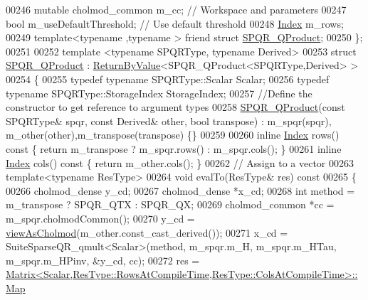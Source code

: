\begin{DoxyCode}
00246     \textcolor{keyword}{mutable} cholmod\_common m\_cc; \textcolor{comment}{// Workspace and parameters}
00247     \textcolor{keywordtype}{bool} m\_useDefaultThreshold;     \textcolor{comment}{// Use default threshold}
00248     \hyperlink{namespace_eigen_a62e77e0933482dafde8fe197d9a2cfde}{Index} m\_rows;
00249     \textcolor{keyword}{template}<\textcolor{keyword}{typename} ,\textcolor{keyword}{typename} > \textcolor{keyword}{friend} \textcolor{keyword}{struct }\hyperlink{struct_eigen_1_1_s_p_q_r___q_product}{SPQR\_QProduct};
00250 \};
00251 
00252 \textcolor{keyword}{template} <\textcolor{keyword}{typename} SPQRType, \textcolor{keyword}{typename} Derived>
00253 \textcolor{keyword}{struct }\hyperlink{struct_eigen_1_1_s_p_q_r___q_product}{SPQR\_QProduct} : \hyperlink{group___core___module_class_eigen_1_1_return_by_value}{ReturnByValue}<SPQR\_QProduct<SPQRType,Derived> >
00254 \{
00255   \textcolor{keyword}{typedef} \textcolor{keyword}{typename} SPQRType::Scalar Scalar;
00256   \textcolor{keyword}{typedef} \textcolor{keyword}{typename} SPQRType::StorageIndex StorageIndex;
00257   \textcolor{comment}{//Define the constructor to get reference to argument types}
00258   \hyperlink{struct_eigen_1_1_s_p_q_r___q_product}{SPQR\_QProduct}(\textcolor{keyword}{const} SPQRType& spqr, \textcolor{keyword}{const} Derived& other, \textcolor{keywordtype}{bool} transpose) : m\_spqr(spqr),
      m\_other(other),m\_transpose(transpose) \{\}
00259   
00260   \textcolor{keyword}{inline} \hyperlink{namespace_eigen_a62e77e0933482dafde8fe197d9a2cfde}{Index} rows()\textcolor{keyword}{ const }\{ \textcolor{keywordflow}{return} m\_transpose ? m\_spqr.rows() : m\_spqr.cols(); \}
00261   \textcolor{keyword}{inline} \hyperlink{namespace_eigen_a62e77e0933482dafde8fe197d9a2cfde}{Index} cols()\textcolor{keyword}{ const }\{ \textcolor{keywordflow}{return} m\_other.cols(); \}
00262   \textcolor{comment}{// Assign to a vector}
00263   \textcolor{keyword}{template}<\textcolor{keyword}{typename} ResType>
00264   \textcolor{keywordtype}{void} evalTo(ResType& res)\textcolor{keyword}{ const}
00265 \textcolor{keyword}{  }\{
00266     cholmod\_dense y\_cd;
00267     cholmod\_dense *x\_cd; 
00268     \textcolor{keywordtype}{int} method = m\_transpose ? SPQR\_QTX : SPQR\_QX; 
00269     cholmod\_common *cc = m\_spqr.cholmodCommon();
00270     y\_cd = \hyperlink{namespace_eigen_ac9fb9e40cfc9ddbdc7da84ee01bb7545}{viewAsCholmod}(m\_other.const\_cast\_derived());
00271     x\_cd = SuiteSparseQR\_qmult<Scalar>(method, m\_spqr.m\_H, m\_spqr.m\_HTau, m\_spqr.m\_HPinv, &y\_cd, cc);
00272     res = 
      \hyperlink{group___core___module_class_eigen_1_1_matrix}{Matrix<Scalar,ResType::RowsAtCompileTime,ResType::ColsAtCompileTime>::Map}

\end{DoxyCode}
